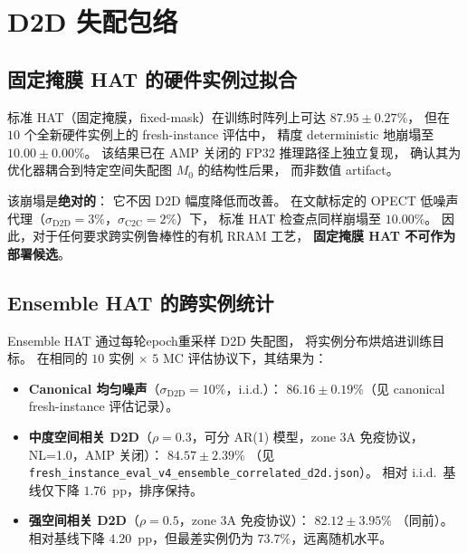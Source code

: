 \section{D2D 失配包络}
\label{sec:d2d-envelope}

\subsection{固定掩膜 HAT 的硬件实例过拟合}

标准 HAT（固定掩膜，fixed-mask）在训练时阵列上可达 $87.95\pm0.27\%$，
但在 $10$ 个全新硬件实例上的 fresh-instance 评估中，
精度 deterministic 地崩塌至 $10.00\pm0.00\%$。
该结果已在 AMP 关闭的 FP32 推理路径上独立复现，
确认其为优化器耦合到特定空间失配图 $M_0$ 的结构性后果，
而非数值 artifact。

该崩塌是\textbf{绝对的}：
它不因 D2D 幅度降低而改善。
在文献标定的 OPECT 低噪声代理（$\sigma_{\mathrm{D2D}}=3\%$，$\sigma_{\mathrm{C2C}}=2\%$）下，
标准 HAT 检查点同样崩塌至 $10.00\%$。
因此，对于任何要求跨实例鲁棒性的有机 RRAM 工艺，
\textbf{固定掩膜 HAT 不可作为部署候选}。

\subsection{Ensemble HAT 的跨实例统计}

Ensemble HAT 通过每轮epoch重采样 D2D 失配图，
将实例分布烘焙进训练目标。
在相同的 $10$ 实例 $\times$ $5$ MC 评估协议下，其结果为：

\begin{itemize}
    \item \textbf{Canonical 均匀噪声}（$\sigma_{\mathrm{D2D}}=10\%$，i.i.d.）：
    $86.16\pm0.19\%$（见 canonical fresh-instance 评估记录）。
    \item \textbf{中度空间相关 D2D}（$\rho=0.3$，可分 AR(1) 模型，zone 3A 免疫协议，NL=1.0，AMP 关闭）：
    $84.57\pm2.39\%$
    （见 \texttt{fresh\_instance\_eval\_v4\_ensemble\_correlated\_d2d.json}）。
    相对 i.i.d.~基线仅下降 $1.76$~pp，排序保持。
    \item \textbf{强空间相关 D2D}（$\rho=0.5$，zone 3A 免疫协议）：
    $82.12\pm3.95\%$
    （同前）。
    相对基线下降 $4.20$~pp，但最差实例仍为 $73.7\%$，远离随机水平。
\end{itemize}

